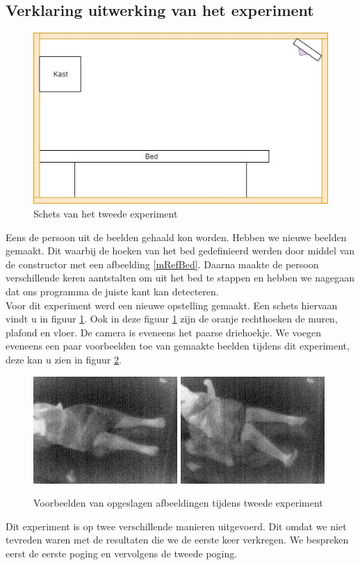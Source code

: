 \subsection{Verklaring uitwerking van het experiment}
\label{ERefDBV}
\begin{figure}[hbp]
	\includegraphics[scale=0.6]{SchetsExperimentTwee}
	\caption{Schets van het tweede experiment}
	\label{imgTEx}
\end{figure}
Eens de persoon uit de beelden gehaald kon worden. Hebben we nieuwe beelden gemaakt. Dit waarbij de hoeken van het bed gedefinieerd werden door middel van de constructor met een afbeelding \ref{mRefBed}. Daarna maakte de persoon verschillende keren aantstalten om uit het bed te stappen en hebben we nagegaan dat ons programma de juiste kant kan detecteren. \\
Voor dit experiment werd een nieuwe opstelling gemaakt. Een schets hiervaan vindt u in figuur \ref{imgTEx}.
Ook in deze figuur \ref{imgTEx} zijn de oranje rechthoeken de muren, plafond en vloer. De camera is eveneens het paarse driehoekje. We voegen eveneens een paar voorbeelden toe van gemaakte beelden tijdens dit experiment, deze kan u zien in figuur \ref{imgTEx1}.
\begin{figure}[hbp]
	\includegraphics[scale=0.85]{TweedeExperiment_img0}
	\includegraphics[scale=0.85]{TweedeExperiment_img4}
	\caption{Voorbeelden van opgeslagen afbeeldingen tijdens tweede experiment}
	\label{imgTEx1}
\end{figure}
Dit experiment is op twee verschillende manieren uitgevoerd. Dit omdat we niet tevreden waren met de resultaten die we de eerste keer verkregen. We bespreken eerst de eerste poging en vervolgens de tweede poging. 
